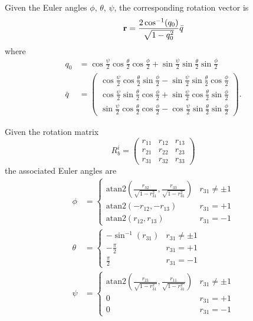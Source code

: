\begin{lemma}
Given the Euler angles $\phi$, $\theta$, $\psi$, the corresponding rotation vector is
\[
\mathbf{r} = \frac{2\cos^{-1}(q_0)}{\sqrt{1-q_0^2}}\bar{q}
\]
where 
\begin{align*}
q_0 &= \cos\frac{\psi}{2}\cos\frac{\theta}{2}\cos\frac{\phi}{2}+\sin\frac{\psi}{2}\sin\frac{\theta}{2}\sin\frac{\phi}{2} \\
\bar{q} &= \begin{pmatrix}
	\cos\frac{\psi}{2}\cos\frac{\theta}{2}\sin\frac{\phi}{2}-\sin\frac{\psi}{2}\sin\frac{\theta}{2}\cos\frac{\phi}{2} \\
	\cos\frac{\psi}{2}\sin\frac{\theta}{2}\cos\frac{\phi}{2}+\sin\frac{\psi}{2}\cos\frac{\theta}{2}\sin\frac{\phi}{2} \\
	\sin\frac{\psi}{2}\cos\frac{\theta}{2}\cos\frac{\phi}{2}-\cos\frac{\psi}{2}\sin\frac{\theta}{2}\sin\frac{\phi}{2}	 	
 \end{pmatrix}.
\end{align*}
\end{lemma}

\begin{lemma}
Given the rotation matrix 
\[
R_b^i = \begin{pmatrix} 
	r_{11} &  r_{12} &  r_{13} \\ 		
	r_{21} &  r_{22} &  r_{23} \\ 		
	r_{31} &  r_{32} &  r_{33}		
 \end{pmatrix}
\]
the associated Euler angles are 
\begin{align*}
\phi &= \begin{cases} 
 \text{atan2}(\frac{r_{32}}{\sqrt{1-r_{31}^2}}, \frac{r_{33}}{\sqrt{1-r_{31}^2}}) & r_{31}\neq \pm 1 \\
 \text{atan2}(-r_{12}, -r_{13}) & r_{31} = +1 \\
 \text{atan2}(r_{12}, r_{13}) & r_{31} = -1
 \end{cases} \\
\theta &= \begin{cases}
 -\sin^{-1}(r_{31}) & 	r_{31}\neq \pm 1 \\
 -\frac{\pi}{2} & r_{31} = +1 \\
 \frac{\pi}{2} & r_{31} = -1
 \end{cases} \\
\psi &= \begin{cases}
 \text{atan2}(\frac{r_{21}}{\sqrt{1-r_{31}^2}}, \frac{r_{11}}{\sqrt{1-r_{31}^2}}) & r_{31}\neq \pm 1 \\
 0 & r_{31} = +1 \\
 0 & r_{31} = -1
 \end{cases}
\end{align*}
\end{lemma}


